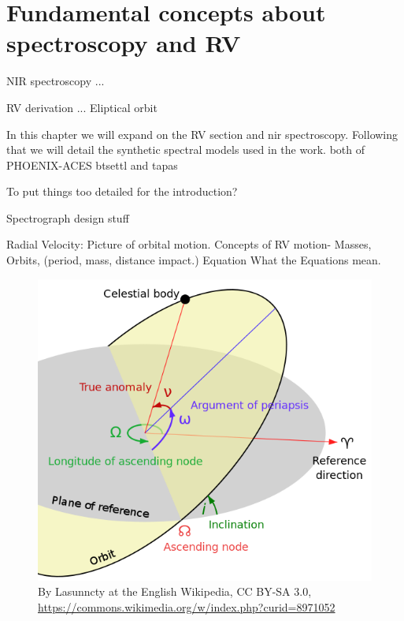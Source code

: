 
\chapter{Fundamental concepts about spectroscopy and RV}
\label{cha:concepts}

NIR spectroscopy ...


RV derivation ...
Eliptical orbit

In this chapter we will expand on the RV section and nir spectroscopy. Following that we will detail the synthetic spectral models used in the work. both of PHOENIX-ACES btsettl and tapas 


To put things too detailed for the introduction?


Spectrograph design stuff


Radial Velocity:
Picture of orbital motion.
Concepts of {RV} motion-
Masses,
Orbits, (period, mass, distance impact.)
Equation
What the Equations mean.
\begin{figure}
    \centering
    \includegraphics[width=0.7\linewidth]{figures/advanced_material/orbit}
    \caption{By Lasunncty at the English Wikipedia, CC BY-SA 3.0, \href{https://commons.wikimedia.org/w/index.php?curid=8971052}{https://commons.wikimedia.org/w/index.php?curid=8971052}}
    \label{fig:orbit}
\end{figure}

{ }

